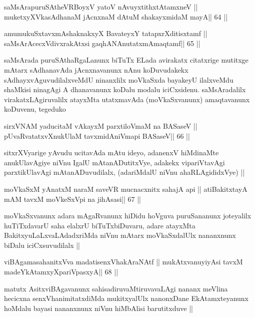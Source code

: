 \begin{shl}
saMsArapuruSAtheVRBoyxV yatoV nAvuyxtithxtAtamxneV ||
muketxyXVkasAdhanaM jAcnxnaM dAtuM shakayxmidaM mayA\hfill || 64 ||
\end{shl}

\begin{shl}
amumukuSxtavxmAshaknakxyX BavateyxY tatapxrXditisxtamf ||
saMsArAcecxVdivxrakAtx\s si gaqhANAnutatxmAmaqtamf\hfill || 65 ||
\end{shl}

\begin{artha}
saMsArada puruSAthaRgaLanunx biTuTx ELada avirakatx citatxrige
mutitxge mAtarx sAdhanavAda jAcnxnavanunx nAnu koDuvudakekx
sAdhayxvAguvudilalxveMdU ninanxlilx moVkaSxda bayakeyU ilalxveMdu
shaMkisi ninagAgi A dhanavanunx koDalu modalu
iciCxsidenu. saMsAradalilx virakatxLAgiruvalilx atayxMta utatxmavAda
(moVkaSxvanunx) amaqtavanunx koDuvenu, tegeduko
\end{artha}

\begin{shl}
sirxVNAM yaducitaM vAkayxM parxtiloVmaM na BASaseV ||
pUvaRvatatxvXnukUlaM tavxmidAniVmapi BASaseV\hfill || 66 ||
\end{shl}

\begin{artha}
sitxrXVyarige yAvudu ucitavAda mAtu ideyo, adanenxV hiMdinaMte
anukUlavAgiye niVnu IgalU mAtanADutitxVye, adakekx vipariVtavAgi
parxtikUlavAgi mAtanADuvudilalx, (adariMdalU niVnu ahaRLAgididxVye) ||
\end{artha}

\begin{shl}
moVkaSxM yAnatxM naraM saveVR mucnacxnitx sahajA api ||
atiBakitxtayA mAM tavxM moVkeSxV\s pi na jihAsasi\hfill || 67 ||
\end{shl}

\begin{artha}
moVkaSxvanunx adara mAgaRvanunx hiDidu hoVguva puruSananunx joteyalilx
huTiTxdavarU saha elalxrU biTuTxbiDuvaru, adare atayxMta
BakitxyuLaLxvaLAdadxriMda niVnu mAtarx moVkaSxdalUlx nananxnunx biDalu
iciCxsuvudilalx ||
\end{artha}

\begin{shl}
viBAgamasahanitxVva madatisenxVhakAraNAtf ||
mukAtxvanuyiyAsi tavxM madeYkAtamxyXpariVpasxyA\hfill || 68 ||
\end{shl}

\begin{artha}
matutx AsitxviBAgavanunx sahisadiruvaMtiruvavaLAgi nananx meVlina
hecicxna senxVhanimitatxdiMda mukitxyalUlx nanonxDane EkAtamxteyanunx
hoMdalu bayasi nananxnunx niVnu hiMbAlisi barutitxduve ||
\end{artha}

